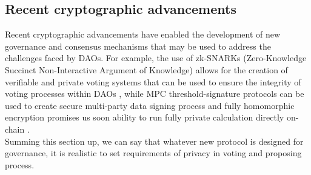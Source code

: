 \documentclass{article}
\begin{document}
\begin{CJK}{UTF8}{gbsn}
\begin{multicols}{2}
        \subsection{Recent cryptographic advancements}
        Recent cryptographic advancements have enabled the development of new governance and consensus mechanisms that may be used to address the challenges faced by DAOs. For example, the use of zk-SNARKs (Zero-Knowledge Succinct Non-Interactive Argument of Knowledge) allows for the creation of verifiable and private voting systems that can be used to ensure the integrity of voting processes within DAOs \cite{Ben-Sasson2014}, while MPC threshold-signature protocols can be used to create secure multi-party data signing process \cite{Doerner2023} and fully homomorphic encryption promises us soon ability to run fully private calculation directly on-chain \cite{Fhenix}.\\
        Summing this section up, we can say that whatever new protocol is designed for governance, it is realistic to set requirements of privacy in voting and proposing process.


\end{multicols}
\end{CJK}
\end{document}
